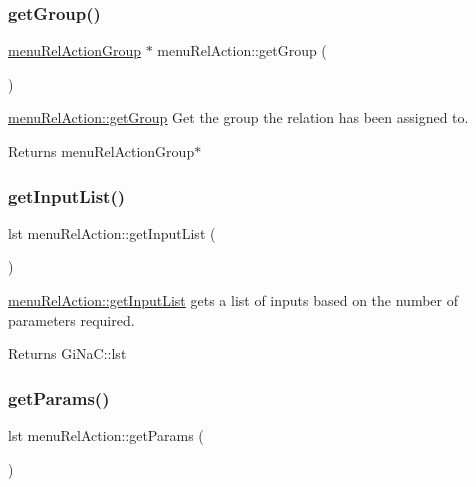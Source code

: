 \subsubsection{\texorpdfstring{get\+Group()}{getGroup()}}
{\footnotesize\ttfamily \mbox{\hyperlink{classmenu_rel_action_group}{menu\+Rel\+Action\+Group}} $\ast$ menu\+Rel\+Action\+::get\+Group (\begin{DoxyParamCaption}{ }\end{DoxyParamCaption})}



\mbox{\hyperlink{classmenu_rel_action_aca0baeed9c6a266d677dae8dfb25d65b}{menu\+Rel\+Action\+::get\+Group}} Get the group the relation has been assigned to. 

\begin{DoxyReturn}{Returns}
menu\+Rel\+Action\+Group$\ast$ 
\end{DoxyReturn}
\mbox{\label{classmenu_rel_action_a8ec0134231f519695901fa4d750fab4a}} 
\subsubsection{\texorpdfstring{get\+Input\+List()}{getInputList()}}
{\footnotesize\ttfamily lst menu\+Rel\+Action\+::get\+Input\+List (\begin{DoxyParamCaption}{ }\end{DoxyParamCaption})}



\mbox{\hyperlink{classmenu_rel_action_a8ec0134231f519695901fa4d750fab4a}{menu\+Rel\+Action\+::get\+Input\+List}} gets a list of inputs based on the number of parameters required. 

\begin{DoxyReturn}{Returns}
Gi\+Na\+C\+::lst 
\end{DoxyReturn}
\mbox{\label{classmenu_rel_action_a8da5cc4f4063d4ea465d67b0aabc57e7}} 
\subsubsection{\texorpdfstring{get\+Params()}{getParams()}}
{\footnotesize\ttfamily lst menu\+Rel\+Action\+::get\+Params (\begin{DoxyParamCaption}{ }\end{DoxyParamCaption})}



